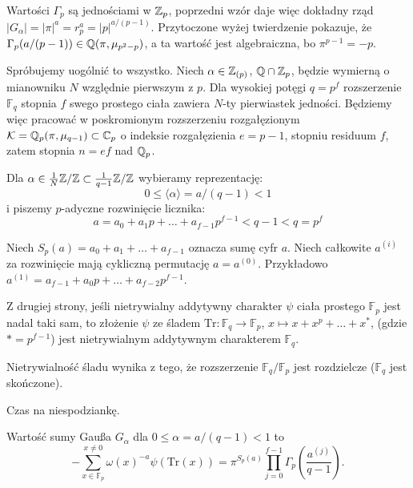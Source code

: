 Wartości $\Gamma_p$ są jednościami w $\mathbb Z_p$, poprzedni wzór daje więc dokładny rząd $|G_\alpha| = |\pi|^a = r_p^a = |p|^{a/(p-1)}$.
Przytoczone wyżej twierdzenie pokazuje, że $\Gamma_p(a/(p-1)) \in \mathbb Q(\pi,\mu_{p^2-p})$, a ta wartość jest algebraiczna, bo $\pi^{p-1} = -p$.

Spróbujemy uogólnić to wszystko.
Niech $\alpha \in \mathbb Z_{(p)}$, $\mathbb Q \cap \mathbb Z_p$, będzie wymierną o mianowniku $N$ względnie pierwszym z $p$.
Dla wysokiej potęgi $q = p^f$ rozszerzenie $\mathbb F_q$ stopnia $f$ swego  prostego ciała zawiera $N$-ty pierwiastek jedności.
Będziemy więc pracować w poskromionym rozszerzeniu rozgałęzionym
${\mathcal K = \mathbb Q_p(\pi, \mu_{q-1}) \subset \mathbb C_p}$ o indeksie rozgałęzienia $e = p-1$, stopniu  residuum $f$, zatem stopnia $n = ef$ nad $\mathbb Q_p$.

Dla $\alpha \in \frac{1}{N} \mathbb Z/\mathbb Z \subset \frac{1}{q-1} \mathbb Z/\mathbb Z$ wybieramy reprezentację:
\[
	0 \le \langle \alpha \rangle = a/(q-1) < 1
\]
i piszemy $p$-adyczne rozwinięcie licznika:
\[
	a = a_0 + a_1p + \ldots + a_{f-1}p^{f-1} < q-1 < q =  p^f
\]

Niech $S_p(a) = a_0 + a_1 +\ldots + a_{f-1}$ oznacza sumę cyfr $a$.
Niech całkowite $a^{(i)}$ za rozwinięcie mają cykliczną permutację $a = a^{(0)}$.
Przykładowo $a^{(1)} = a_{f-1} + a_0p + \dots + a_{f-2}p^{f-1}$.

Z drugiej strony, jeśli nietrywialny addytywny charakter $\psi$ ciała prostego $\mathbb F_p$ jest nadal taki sam, to złożenie $\psi$ ze śladem
$\textrm{Tr} \colon \mathbb F_q \to \mathbb F_p$, $x \mapsto x + x^p + \dots + x^{*}$, (gdzie $* = p^{f-1}$) jest nietrywialnym addytywnym charakterem $\mathbb F_q$.

Nietrywialność śladu wynika z tego, że rozszerzenie $\mathbb F_q / \mathbb F_p$ jest rozdzielcze ($\mathbb F_q$ jest skończone).

Czas na niespodziankę.

\begin{twierdzenie} 
	Wartość sumy Gaußa $G_\alpha$ dla $0 \le \alpha = a / (q-1) < 1$ to
	\[
		-\sum_{x \in \mathbb F_p}^{x\neq 0} \omega(x)^{-a} \psi (\textrm{Tr}(x)) = \pi^{S_p(a)} \prod_{j=0}^{f-1} \Gamma_p \left( \frac{a^{(j)}}{q-1} \right).
	\]
\end{twierdzenie}
